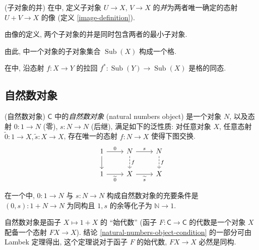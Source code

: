 \begin{propdef}
	{(子对象的并)}
	在\topos{}中, 定义子对象 $U\to X$, $V\to X$ 的\emph{并}为两者唯一确定的态射 $U+V\to X$ 的像 (定义 \ref{image-definition}).
	
	由像的定义, 两个子对象的并是同时包含两者的最小子对象.
\end{propdef}

由此, \topos{}中一个对象的子对象集合 $\operatorname{Sub}(X)$ 构成一个格.

\begin{prop}
	{}
	在\topos{}中, 沿态射 $f\colon X \to Y$ 的拉回 $f^*\colon \operatorname{Sub}(Y)\to \operatorname{Sub}(X)$ 是格的同态.
\end{prop}






\subsection{自然数对象}

\begin{definition}
    {(自然数对象)}
    \topos{} $\mathsf C$ 中的\emph{自然数对象} (natural numbers object) 是一个对象 $N$,
    以及态射 $0 \colon 1 \to N$ (零),
    $s \colon N \to N$ (后继),
    满足如下的泛性质: 对任意对象 $X$,
    任意态射 $\widetilde 0\colon 1\to X,\widetilde s\colon X\to X$,
    存在唯一的态射 $f\colon N\to X$ 使得下图交换.
\[\begin{tikzcd}[ampersand replacement=\&]
	1 \& N \& N \\
	1 \& X \& X
	\arrow[from=1-1, to=2-1]
	\arrow["0", from=1-1, to=1-2]
	\arrow["s", from=1-2, to=1-3]
	\arrow["{\widetilde 0}"', from=2-1, to=2-2]
	\arrow["{\widetilde s}"', from=2-2, to=2-3]
	\arrow["f", dashed, from=1-2, to=2-2]
	\arrow["f", dashed, from=1-3, to=2-3]
\end{tikzcd}\]
\end{definition}

\begin{prop}
	[label={natural-numbers-object-condition}]
	{}
	在一个\topos{}中, $0\colon 1\to N$ 与 $s\colon N\to N$ 构成自然数对象的充要条件是 $(0,s)\colon 1+N\to N$ 为同构且 $1,s$ 的余等化子为 $\mathbb{N}\to 1$.
\end{prop}
\begin{remark}
	{}
	自然数对象是函子 $X\mapsto 1+X$ 的 ``始代数'' \footnotemark(函子 $F\colon \mathsf C\to \mathsf C$ 的代数是一个对象 $X$ 配备一个态射 $FX\to X$). 结论 \ref{natural-numbers-object-condition} 的一部分可由 Lambek 定理得出, 这个定理说对于函子 $F$ 的始代数, $FX\to X$ 必然是同构.
\end{remark}

